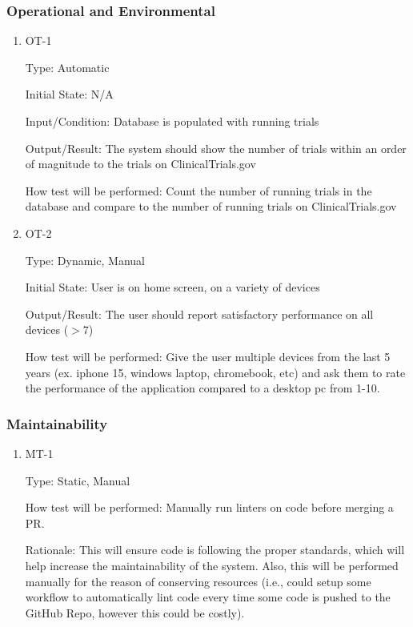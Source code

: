 \documentclass[12pt, titlepage]{article}
\begin{document}
\subsubsection{Operational and Environmental}
		
\begin{enumerate}

\item{OT-1\\}

Type: Automatic
					
Initial State: N/A
					
Input/Condition: Database is populated with running trials
					
Output/Result: The system should show the number of trials within an order of magnitude to the trials on ClinicalTrials.gov
					
How test will be performed: Count the number of running trials in the database and compare to the number of 
running trials on ClinicalTrials.gov

\item{OT-2\\}

Type: Dynamic, Manual
					
Initial State: User is on home screen, on a variety of devices
					
Output/Result: The user should report satisfactory performance on all devices ($>7$)
					
How test will be performed: Give the user multiple devices from the last 5 years (ex. iphone 15, windows laptop, chromebook, etc)
and ask them to rate the performance of the application compared to a desktop pc from 1-10.

\end{enumerate}

\subsubsection{Maintainability}

\begin{enumerate}

\item{MT-1\\}

Type: Static, Manual
					
How test will be performed: Manually run linters on code before merging a PR.

Rationale: This will ensure code is following the proper standards, which will help increase the maintainability of the system.
Also, this will be performed manually for the reason of conserving resources (i.e., could setup some workflow to automatically lint 
code every time some code is pushed to the GitHub Repo, however this could be costly).

\end{enumerate}
\end{document}
